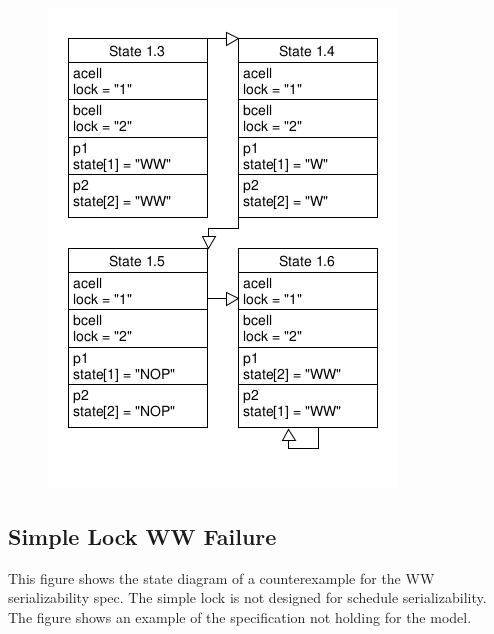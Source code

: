 \begin{figure}[H]
	\includegraphics[width=\linewidth]{2pl_deadlock.jpg}
\end{figure}

\subsection{Simple Lock WW Failure}
This figure shows the state diagram of a counterexample for the WW serializability spec. The simple lock is not designed for schedule serializability. The figure shows an example of the specification not holding for the model.

